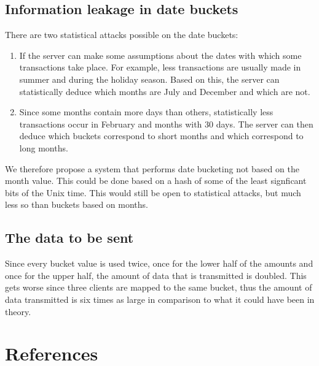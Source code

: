 \documentclass[a4paper]{article}
\begin{document}
	\subsection{Information leakage in date buckets}
    There are two statistical attacks possible on the date buckets:
    \begin{enumerate}
	    \item If the server can make some assumptions about the dates with which some transactions take place. For example, less transactions are usually made in summer and during the holiday season. Based on this, the server can statistically deduce which months are July and December and which are not.
        \item Since some months contain more days than others, statistically less transactions occur in February and months with 30 days. The server can then deduce which buckets correspond to short months and which correspond to long months.
    \end{enumerate}
    We therefore propose a system that performs date bucketing not based on the month value. This could be done based on a hash of some of the least signficant bits of the Unix time. This would still be open to statistical attacks, but much less so than buckets based on months.

    \subsection{The data to be sent}
    	Since every bucket value is used twice, once for the lower half of the amounts and once for the upper half, the amount of data that is transmitted is doubled. This gets worse since three clients are mapped to the same bucket, thus the amount of data transmitted is six times as large in comparison to what it could have been in theory.
    	

\section{References}
		
		
\end{document}
